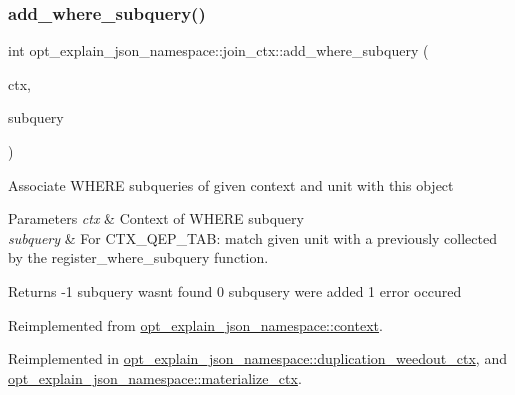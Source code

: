 \subsubsection{\texorpdfstring{add\+\_\+where\+\_\+subquery()}{add\_where\_subquery()}}
{\footnotesize\ttfamily int opt\+\_\+explain\+\_\+json\+\_\+namespace\+::join\+\_\+ctx\+::add\+\_\+where\+\_\+subquery (\begin{DoxyParamCaption}\item[{\mbox{\hyperlink{classopt__explain__json__namespace_1_1subquery__ctx}{subquery\+\_\+ctx}} $\ast$}]{ctx,  }\item[{S\+E\+L\+E\+C\+T\+\_\+\+L\+E\+X\+\_\+\+U\+N\+IT $\ast$}]{subquery }\end{DoxyParamCaption})\hspace{0.3cm}{\ttfamily [virtual]}}

Associate W\+H\+E\+RE subqueries of given context and unit with this object


\begin{DoxyParams}{Parameters}
{\em ctx} & Context of W\+H\+E\+RE subquery \\
\hline
{\em subquery} & For C\+T\+X\+\_\+\+Q\+E\+P\+\_\+\+T\+AB\+: match given unit with a previously collected by the register\+\_\+where\+\_\+subquery function. \\
\hline
\end{DoxyParams}
\begin{DoxyReturn}{Returns}
-\/1 subquery wasn\textquotesingle{}t found 0 subqusery were added 1 error occured 
\end{DoxyReturn}


Reimplemented from \mbox{\hyperlink{classopt__explain__json__namespace_1_1context_ae6606674e90fec03200823c35994873c}{opt\+\_\+explain\+\_\+json\+\_\+namespace\+::context}}.



Reimplemented in \mbox{\hyperlink{classopt__explain__json__namespace_1_1duplication__weedout__ctx_ab9ed2cd6372ca07ead08bbe7ad56db22}{opt\+\_\+explain\+\_\+json\+\_\+namespace\+::duplication\+\_\+weedout\+\_\+ctx}}, and \mbox{\hyperlink{classopt__explain__json__namespace_1_1materialize__ctx_ae6715f07cfd160747433ad80fd78deac}{opt\+\_\+explain\+\_\+json\+\_\+namespace\+::materialize\+\_\+ctx}}.

\mbox{\label{classopt__explain__json__namespace_1_1join__ctx_aa37b36787c204c852a8d7578459cfbc0}} 
